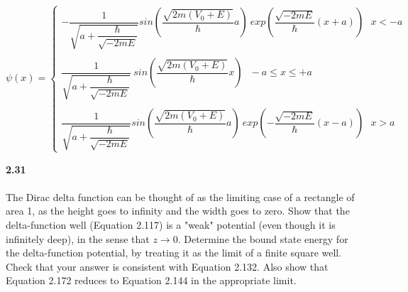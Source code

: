 \documentclass[fleqn]{article}
\begin{document}
{    $
      \psi(x)=\begin{cases}
        -\dfrac{1}{\sqrt{a+\dfrac{\hbar}{\sqrt{-2mE}}}}  sin\left(\dfrac{\sqrt{2m(V_0+E)}}{\hbar}a\right) ~ exp\left(\dfrac{\sqrt{-2mE}}{\hbar}(x+a)\right) ~~~ x<-a \\
        \\
        \dfrac{1}{\sqrt{a+\dfrac{\hbar}{\sqrt{-2mE}}}} ~ sin\left(\dfrac{\sqrt{2m(V_0+E)}}{\hbar}x\right) ~~~ -a \leq x\leq +a \\
        \\
        \dfrac{1}{\sqrt{a+\dfrac{\hbar}{\sqrt{-2mE}}}}  sin\left(\dfrac{\sqrt{2m(V_0+E)}}{\hbar}a\right) ~ exp\left(-\dfrac{\sqrt{-2mE}}{\hbar}(x-a)\right) ~~~ x>a 
      \end{cases}
    $
  }

  \pagebreak

  \textbf{2.31} \\ \\
  The Dirac delta function can be thought of as the limiting case of a
  rectangle of area 1, as the height goes to infinity and the width goes to zero. Show
  that the delta-function well (Equation 2.117) is a "weak" potential (even though it
  is infinitely deep), in the sense that $z \rightarrow 0$. Determine the bound state energy
  for the delta-function potential, by treating it as the limit of a finite square well.
  Check that your answer is consistent with Equation 2.132. Also show that
  Equation 2.172 reduces to Equation 2.144 in the appropriate limit.
\end{document}
